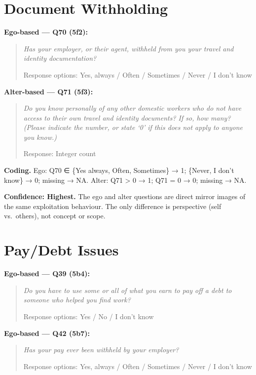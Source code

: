 \documentclass[
  12pt,
  letterpaper,
  DIV=11,
  numbers=noendperiod]{scrreprt}
\begin{document}
\section{Document Withholding}\label{sec-b-doc}

\textbf{Ego-based --- Q70 (5f2):}

\begin{quote}
\emph{Has your employer, or their agent, withheld from you your travel
and identity documentation?}

Response options: Yes, always / Often / Sometimes / Never / I don't know
\end{quote}

\textbf{Alter-based --- Q71 (5f3):}

\begin{quote}
\emph{Do you know personally of any other domestic workers who do not
have access to their own travel and identity documents? If so, how many?
(Please indicate the number, or state `0' if this does not apply to
anyone you know.)}

Response: Integer count
\end{quote}

\textbf{Coding.} Ego: Q70 ∈ \{Yes always, Often, Sometimes\} → 1;
\{Never, I don't know\} → 0; missing → NA. Alter: Q71 \textgreater{} 0 →
1; Q71 = 0 → 0; missing → NA.

\textbf{Confidence: Highest.} The ego and alter questions are direct
mirror images of the same exploitation behaviour. The only difference is
perspective (self vs.~others), not concept or scope.

\section{Pay/Debt Issues}\label{sec-b-pay}

\textbf{Ego-based --- Q39 (5b4):}

\begin{quote}
\emph{Do you have to use some or all of what you earn to pay off a debt
to someone who helped you find work?}

Response options: Yes / No / I don't know
\end{quote}

\textbf{Ego-based --- Q42 (5b7):}

\begin{quote}
\emph{Has your pay ever been withheld by your employer?}

Response options: Yes, always / Often / Sometimes / Never / I don't know
\end{quote}
\end{document}
